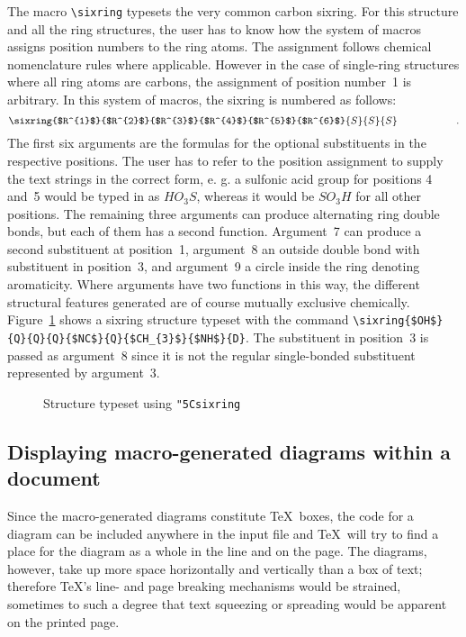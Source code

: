  The macro \verb+\sixring+ typesets the very common carbon sixring.
 For this structure and all the ring structures, the user has to
 know how the system of macros assigns position numbers to the
 ring atoms. The assignment follows chemical nomenclature rules
 where applicable. However in the case of single-ring structures
 where all ring atoms are carbons,
 the assignment of position
 number~1 is arbitrary. In this system of macros, the sixring is
 numbered as follows:
 \[ \sixring{$R^{1}$}{$R^{2}$}{$R^{3}$}{$R^{4}$}{$R^{5}$}{$R^{6}$}
    {S}{S}{S} \hspace{2cm}  \mbox{.}  \]
 The first six arguments are the formulas for the optional
 substituents in the respective positions. The user has to
 refer to the position assignment to supply the text strings
 in the correct form, e. g. a sulfonic acid group for positions
 4 and~5 would be typed in as $HO_{3}S$, whereas it would be
 $SO_{3}H$ for all other positions.  The remaining three
 arguments can produce alternating ring double bonds, but each
 of them has a second function. Argument~7 can produce a second
 substituent at position~1, argument~8 an outside double bond
 with substituent in position~3, and argument~9 a circle inside
 the ring denoting aromaticity. Where arguments have two
 functions in this way, the different structural features
 generated are of course mutually exclusive chemically.
 Figure~\ref{fg:sixexample}
 shows a sixring structure typeset with the command
\verb+\sixring{$OH$}{Q}{Q}{Q}{$NC$}{Q}{$CH_{3}$}{$NH$}{D}+.
 The substituent in position~3 is passed
 as argument~8 since it is not the regular single-bonded
 substituent represented by argument~3.
 
 \begin{figure}\centering
  \caption{Structure typeset using \tt\char"5C{}sixring}
\label{fg:sixexample}
 \end{figure}
 
\subsection{Displaying macro-generated diagrams
    within a document}
 Since the macro-generated diagrams constitute \TeX\  boxes, the
 code for a diagram can be included anywhere in the input file
 and \TeX\  will try to find a place for the diagram as a whole
 in the line and on the page. The diagrams, however, take up
 more space horizontally and vertically than a box of text;
 therefore \TeX's line- and page breaking mechanisms would be
 strained, sometimes to such a degree that text squeezing or
 spreading would be apparent on the printed page.
 
